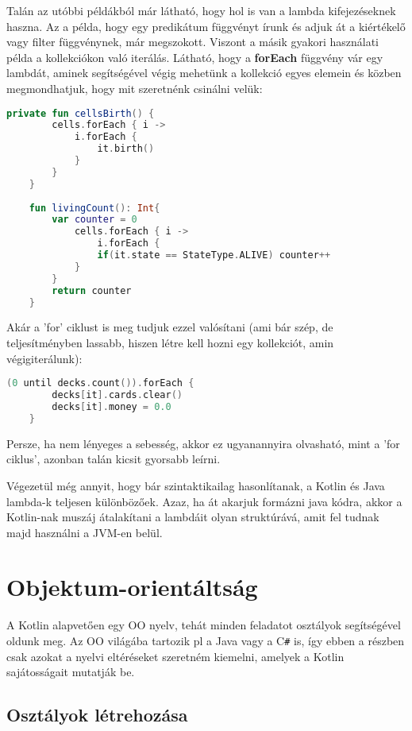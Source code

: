 Talán az utóbbi példákból már látható, hogy hol is van a lambda kifejezéseknek haszna. Az a példa, hogy egy predikátum függvényt írunk és adjuk át a kiértékelő vagy filter függvénynek, már megszokott. Viszont a másik gyakori használati példa a kollekciókon való iterálás. Látható, hogy a \textbf{forEach} függvény vár egy lambdát, aminek segítségével végig mehetünk a kollekció egyes elemein és közben megmondhatjuk, hogy mit szeretnénk csinálni velük:
\scriptsize
\begin{lstlisting}[language = Kotlin]
	private fun cellsBirth() {
		cells.forEach { i ->
			i.forEach {
				it.birth()
			}
		}
	}
	
	fun livingCount(): Int{
		var counter = 0
			cells.forEach { i ->
				i.forEach {
				if(it.state == StateType.ALIVE) counter++
			}
		}
		return counter
	}
\end{lstlisting}
\normalsize
Akár a 'for' ciklust is meg tudjuk ezzel valósítani (ami bár szép, de teljesítményben lassabb, hiszen létre kell hozni egy kollekciót, amin végigiterálunk):
\scriptsize
\begin{lstlisting}[language = Kotlin]
	(0 until decks.count()).forEach {
		decks[it].cards.clear()
		decks[it].money = 0.0
	}
\end{lstlisting}
\normalsize
Persze, ha nem lényeges a sebesség, akkor ez ugyanannyira olvasható, mint a 'for ciklus', azonban talán kicsit gyorsabb leírni.

Végezetül még annyit, hogy bár szintaktikailag hasonlítanak, a Kotlin és Java lambda-k teljesen különbözőek. Azaz, ha át akarjuk formázni java kódra, akkor a Kotlin-nak muszáj átalakítani a lambdáit olyan struktúrává, amit fel tudnak majd használni a JVM-en belül.

\section{Objektum-orientáltság}
\label{sec:k_OO}

A Kotlin alapvetően egy OO nyelv, tehát minden feladatot osztályok segítségével oldunk meg. Az OO világába tartozik pl a Java vagy a C\verb|#| is, így ebben a részben csak azokat a nyelvi eltéréseket szeretném kiemelni, amelyek a Kotlin sajátosságait mutatják be.

\subsection{Osztályok létrehozása}
\label{subsec:k_classes}

